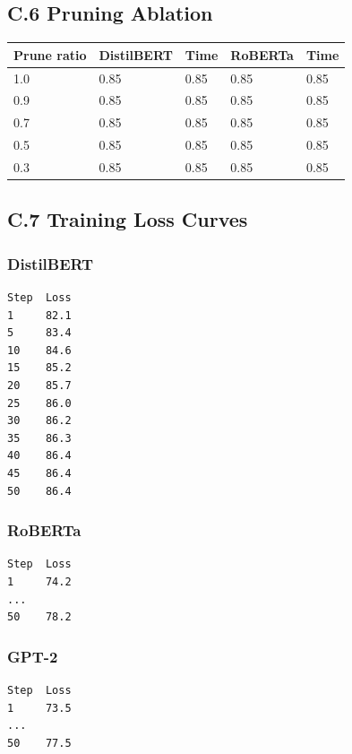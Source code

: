 \subsection{C.6 Pruning Ablation}

\begin{table}[H]
\centering
\small
\begin{tabular}{lllll}
\toprule
\textbf{Prune ratio} & \textbf{DistilBERT} & \textbf{Time} & \textbf{RoBERTa} & \textbf{Time} \\
\midrule
1.0 & 0.85 & 0.85 & 0.85 & 0.85 \\
0.9 & 0.85 & 0.85 & 0.85 & 0.85 \\
0.7 & 0.85 & 0.85 & 0.85 & 0.85 \\
0.5 & 0.85 & 0.85 & 0.85 & 0.85 \\
0.3 & 0.85 & 0.85 & 0.85 & 0.85 \\
\bottomrule
\end{tabular}
\end{table}

\subsection{C.7 Training Loss Curves}

\subsubsection{DistilBERT}

\begin{lstlisting}
Step  Loss
1     82.1
5     83.4
10    84.6
15    85.2
20    85.7
25    86.0
30    86.2
35    86.3
40    86.4
45    86.4
50    86.4
\end{lstlisting}

\subsubsection{RoBERTa}

\begin{lstlisting}
Step  Loss
1     74.2
...
50    78.2
\end{lstlisting}

\subsubsection{GPT-2}

\begin{lstlisting}
Step  Loss
1     73.5
...
50    77.5
\end{lstlisting}

